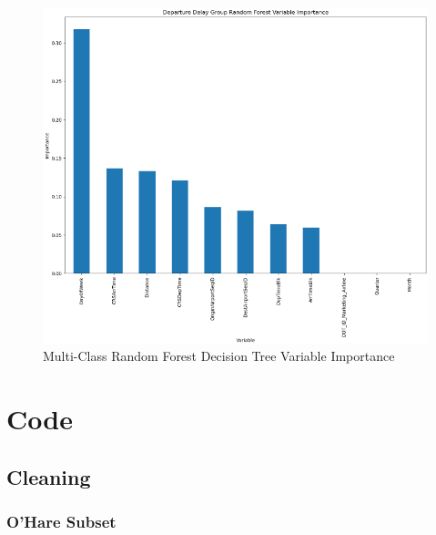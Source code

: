 \documentclass[a4paper,12pt]{article}
\begin{document}
\begin{figure}
    \centering
    \includegraphics*[scale=.50]{../../img/model_rq2_rf_2.png}
    \caption[]{Multi-Class Random Forest Decision Tree Variable Importance}
    \label{fig:model:rq2:rfc_2}
\end{figure}



\section{Code}

\subsection{Cleaning}

\subsubsection{O'Hare Subset} \label{ohre subset}
\end{document}
